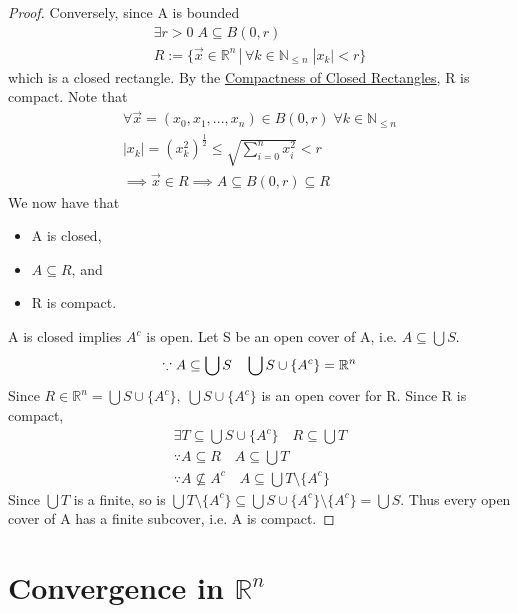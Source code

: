 \documentclass[11pt, oneside]{book}
\theoremstyle{break}
\newtheorem*{proof}{Proof}
\newcommand{\bb}[1]{\mathbb{#1}}			%
\begin{document}
\begin{proof}
	Conversely, since A is bounded
	\begin{gather*}
		\exists r > 0 \; A \subseteq B(0, r) \\
		R := \{\vec{x} \in \bb{R}^n \, | \, \forall k \in \bb{N}_{\leq n} \; |x_k| < r \}
	\end{gather*}
	which is a closed rectangle. By the \hyperref[compact_closed_rect]{Compactness of Closed Rectangles}, R is compact. Note that
	\begin{gather*}
		\forall \vec{x} = (x_0, x_1, ..., x_n) \in B(0, r) \; \forall k \in \bb{N}_{\leq n} \\
		|x_k| = (x_k^2)^\frac{1}{2} \leq \sqrt{\sum_{i=0}^{n} x_i^2} < r \\
		\implies \vec{x} \in R \implies A \subseteq B(0, r) \subseteq R
	\end{gather*}
	We now have that
	\begin{itemize}
		\item A is closed,
		\item $A \subseteq R$, and
		\item R is compact.
	\end{itemize}
	A is closed implies $A^c$ is open. Let S be an open cover of A, i.e. $A \subseteq \bigcup S$.
	\begin{equation*}
		\because A \subseteq \bigcup S \quad \bigcup S \cup \{A^c\} = \bb{R}^n \\
	\end{equation*}
	Since $R \in \bb{R}^n = \bigcup S \cup \{A^c\}, \; \bigcup S \cup \{A^c\}$ is an open cover for R. Since R is compact,
	\begin{gather*}
		\exists T \subseteq \bigcup S \cup \{A^c\} \quad R \subseteq \bigcup T \\
		\because A \subseteq R \quad A \subseteq \bigcup T \\
		\because A \nsubseteq A^c \quad A \subseteq \bigcup T \setminus \{A^c\}
	\end{gather*}
	Since $\bigcup T$ is a finite, so is $\bigcup T \setminus \{A^c\} \subseteq \bigcup S \cup \{A^c\} \setminus \{A^c\} = \bigcup S$. Thus every open cover of A has a finite subcover, i.e. A is compact.
\end{proof}


\chapter{Convergence in \texorpdfstring{$\bb{R}^n$}{Rn}}
\end{document}
